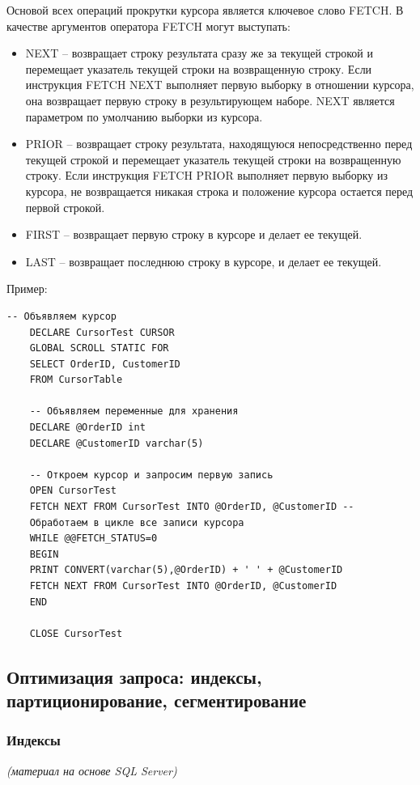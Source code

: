 Основой всех операций прокрутки курсора является
ключевое слово FETCH. В качестве аргументов оператора
FETCH могут выступать:
\begin{itemize}
	\item NEXT – возвращает строку результата сразу же за
	текущей строкой и перемещает указатель текущей строки
	на возвращенную строку. Если инструкция FETCH NEXT
	выполняет первую выборку в отношении курсора, она
	возвращает первую строку в результирующем наборе.
	NEXT является параметром по умолчанию выборки из
	курсора.
	\item PRIOR – возвращает строку результата, находящуюся
	непосредственно перед текущей строкой и перемещает
	указатель текущей строки на возвращенную строку. Если
	инструкция FETCH PRIOR выполняет первую выборку из
	курсора, не возвращается никакая строка и положение
	курсора остается перед первой строкой.
	\item FIRST – возвращает первую строку в курсоре и делает ее
	текущей.
	\item LAST – возвращает последнюю строку в курсоре, и делает
	ее текущей.
\end{itemize}

Пример:
\begin{lstlisting}[label=cursexample2]
	-- Объявляем курсор
	DECLARE CursorTest CURSOR
	GLOBAL SCROLL STATIC FOR
	SELECT OrderID, CustomerID
	FROM CursorTable
	
	-- Объявляем переменные для хранения
	DECLARE @OrderID int
	DECLARE @CustomerID varchar(5)
	
	-- Откроем курсор и запросим первую запись
	OPEN CursorTest
	FETCH NEXT FROM CursorTest INTO @OrderID, @CustomerID --
	Обработаем в цикле все записи курсора
	WHILE @@FETCH_STATUS=0
	BEGIN
	PRINT CONVERT(varchar(5),@OrderID) + ' ' + @CustomerID
	FETCH NEXT FROM CursorTest INTO @OrderID, @CustomerID
	END
	
	CLOSE CursorTest 
\end{lstlisting}

\newpage
\subsection{Оптимизация запроса: индексы, партиционирование, сегментирование}

\subsubsection{Индексы}
\textit{(материал на основе SQL Server)}

